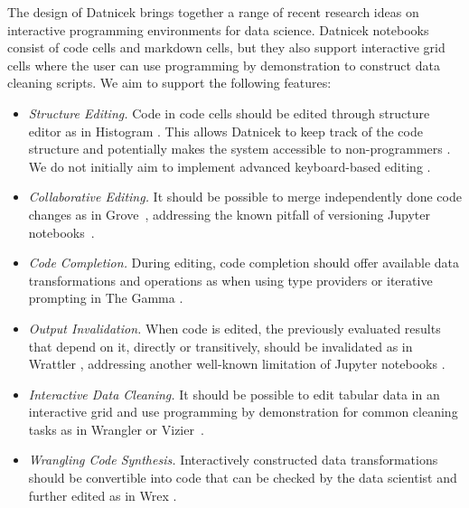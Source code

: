 \documentclass[sigconf,anonymous,screen]{acmart}
\begin{document}
The design of Datnicek brings together a range of recent research ideas on interactive programming
environments for data science. Datnicek notebooks consist of code cells and markdown cells, but
they also support interactive grid cells where the user can use programming by demonstration to
construct data cleaning scripts. We aim to support the following features:

\begin{itemize}
\item \emph{Structure Editing.} Code in code cells should be edited through structure editor
  as in Histogram \cite{petricek-2019-histogram}. This allows Datnicek to keep track of the code
  structure and potentially makes the system accessible to non-programmers \cite{mcnutt-2023-projectional}.
  We do not initially aim to implement advanced keyboard-based editing \cite{moon-2022-tylr,beckman-2023-sandblocks}.

\item \emph{Collaborative Editing.} It should be possible to merge independently done code changes
  as in Grove~\cite{adams-2025-grove}, addressing the known pitfall of versioning Jupyter
  notebooks~\cite{singer-2020-jollity}.

\item \emph{Code Completion.} During editing, code completion should offer available data
  transformations and operations as when using type providers \cite{syme-2013-inforich} or
  iterative prompting in The Gamma \cite{petricek-2022-thegamma}.

\item \emph{Output Invalidation.} When code is edited, the previously evaluated results that
  depend on it, directly or transitively, should be invalidated as in Wrattler \cite{petricek-2018-wrattler,petricek-2020-live},
  addressing another well-known limitation of Jupyter notebooks \cite{koop-2017-dataflow}.

\item \emph{Interactive Data Cleaning.} It should be possible to edit tabular data in an interactive
  grid and use programming by demonstration for common cleaning tasks as in
  Wrangler or Vizier~\cite{kandel-2011-wrangler,kennedy-2022-vizier}.

\item \emph{Wrangling Code Synthesis.} Interactively constructed data transformations should be
  convertible into code that can be checked by the data scientist and further edited as in Wrex \cite{drossos-2020-wrex}.
\end{itemize}
\end{document}
